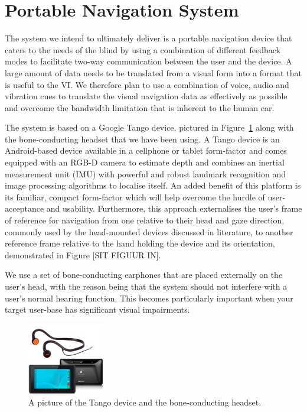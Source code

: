 \documentclass[format=sigconf, review=true, screen=true, anonymous=true]{acmart}
\begin{document}
\section{Portable Navigation System}
\label{sec:portable-navigation}

The system we intend to ultimately deliver is a portable navigation device that caters to the needs of the blind by using a combination of different feedback modes to facilitate two-way communication between the user and the device. A large amount of data needs to be translated from a visual form into a format that is useful to the VI. We therefore plan to use a combination of voice, audio and vibration cues to translate the visual navigation data as effectively as possible and overcome the bandwidth limitation that is inherent to the human ear. 

The system is based on a Google Tango device, pictured in Figure~\ref{fig:tango} along with the bone-conducting headset that we have been using. A Tango device is an Android-based device available in a cellphone or tablet form-factor and comes equipped with an RGB-D camera to estimate depth and combines an inertial measurement unit (IMU) with powerful and robust landmark recognition and image processing algorithms to localise itself. An added benefit of this platform is its familiar, compact form-factor which will help overcome the hurdle of user-acceptance and usability. Furthermore, this approach externalises the user's frame of reference for navigation from one relative to their head and gaze direction, commonly used by the head-mounted devices discussed in literature, to another reference frame relative to the hand holding the device and its orientation, demonstrated in Figure [SIT FIGUUR IN]. 

We use a set of bone-conducting earphones that are placed externally on the user's head, with the reason being that the system should not interfere with a user's normal hearing function. This becomes particularly important when your target user-base has significant visual impairments. 

\begin{figure}
  \centering
  \includegraphics[width=0.3\textwidth]{figures/tango_headphone.png}
  \caption{A picture of the Tango device and the bone-conducting headset.}
  \label{fig:tango}
\end{figure}
\end{document}
